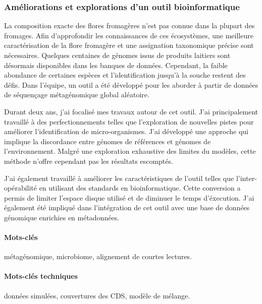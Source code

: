 \subsubsection*{Améliorations et explorations d'un outil
bioinformatique}\label{amuxe9liorations-et-explorations-dun-outil-bioinformatique}

La composition exacte des flores fromagères n'est pas connue dans la
plupart des fromages. Afin d'approfondir les connaissances de ces
écosystèmes, une meilleure caractérisation de la flore fromagère et une
assignation taxonomique précise sont nécessaires. Quelques centaines de
génomes issus de produits laitiers sont désormais disponibles dans les
banques de données. Cependant, la faible abondance de certaines espèces
et l'identification jusqu'à la souche restent des défis. Dans l'équipe,
un outil a été développé pour les aborder à partir de données de
séquençage métagénomique global aléatoire.

Durant deux ans, j'ai focalisé mes travaux autour de cet outil. J'ai
principalement travaillé à des perfectionnements telles que
l'exploration de nouvelles pistes pour améliorer l'identification de
micro-organismes. J'ai développé une approche qui implique la
discordance entre génomes de références et génomes de l'environnement.
Malgré une exploration exhaustive des limites du modèles, cette méthode
n'offre cependant pas les résultats escomptés.

J'ai également travaillé à améliorer les caractéristiques de l'outil
telles que l'inter-opérabilité en utilisant des standards en
bioinformatique. Cette conversion a permis de limiter l'espace disque
utilisé et de diminuer le temps d'éxecution. J'ai également été impliqué
dans l'intégration de cet outil avec une base de données génomique
enrichies en métadonnées.

\paragraph{Mots-clés} métagénomique, microbiome, alignement de courtes
lectures.
\vspace{-2em}
\paragraph{Mots-clés techniques} données simulées, couvertures des CDS,
modèle de mélange.
